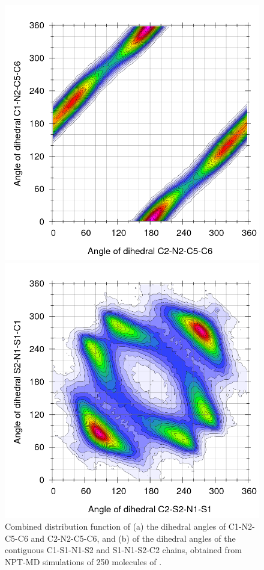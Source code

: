 \documentclass[3p,twocolumn]{elsarticle}
\begin{document}
\begin{figure}[ht]
\centering
  \includegraphics[width=\linewidth]{Ludwig.png}%

  \includegraphics[width=\linewidth]{Ludwig_anion.png}%
\caption{Combined distribution function of (a) the dihedral angles of C1-N2-C5-C6 and C2-N2-C5-C6, and (b) of the dihedral angles of the contiguous  C1-S1-N1-S2 and S1-N1-S2-C2 chains, obtained from NPT-MD simulations of 250 molecules of \ce{[emim][NTf_2]}.}
\label{fig:die_ntf2}
\end{figure}
\end{document}
